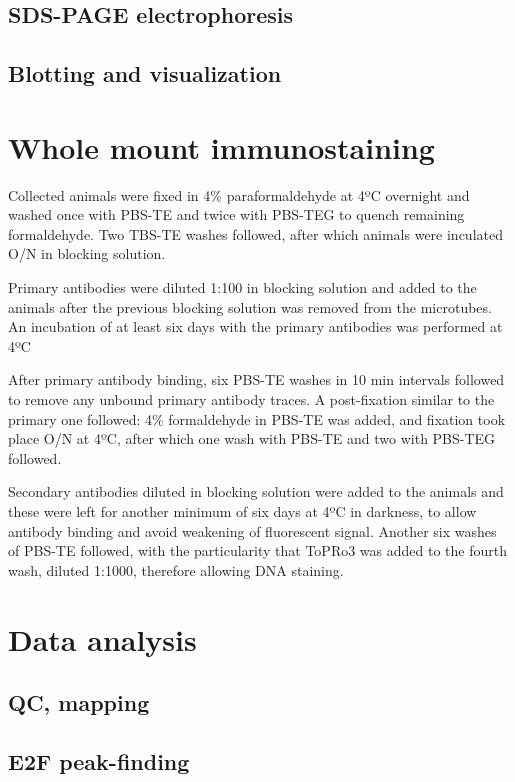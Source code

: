 \documentclass[11pt,twoside,a4paper]{report}
\begin{document}
		\subsection{SDS-PAGE electrophoresis}
		
		\subsection{Blotting and visualization}
	
	\section{Whole mount immunostaining}
		
		Collected animals were fixed in 4\% paraformaldehyde at 4ºC overnight and washed once with PBS-TE and twice with PBS-TEG to quench remaining formaldehyde. Two TBS-TE washes followed, after which animals were inculated O/N in blocking solution.
		
		Primary antibodies were diluted 1:100 in blocking solution and added to the animals after the previous blocking solution was removed from the microtubes. An incubation of at least six days with the primary antibodies was performed at 4ºC
		
		After primary antibody binding, six PBS-TE washes in 10 min intervals followed to remove any unbound primary antibody traces. A post-fixation similar to the primary one followed: 4\% formaldehyde in PBS-TE was added, and fixation took place O/N at 4ºC, after which one wash with PBS-TE and two with PBS-TEG followed. 
		
		Secondary antibodies diluted in blocking solution were added to the animals  and these were left for another minimum of six days at 4ºC in darkness, to allow antibody binding and avoid weakening of fluorescent signal. Another six washes of PBS-TE followed, with the particularity that ToPRo3 was added to the fourth wash, diluted 1:1000, therefore allowing DNA staining.
		
	\section{Data analysis}
		\subsection{QC, mapping}
		\subsection{E2F peak-finding}
\end{document}
